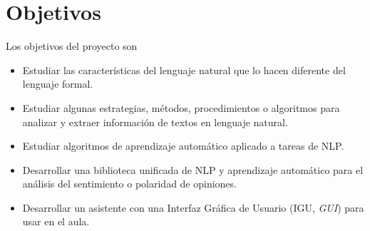 
\chapter{Objetivos}

Los objetivos del proyecto son

\begin{itemize}
\item Estudiar las características del lenguaje natural que lo hacen diferente del lenguaje formal.
\item Estudiar algunas estrategias, métodos, procedimientos o algoritmos para analizar y extraer información de textos en lenguaje natural.
\item Estudiar algoritmos de aprendizaje automático aplicado a tareas de NLP.
\item Desarrollar una biblioteca unificada de NLP y aprendizaje automático para el análisis del sentimiento o polaridad de opiniones.
\item Desarrollar un asistente con una Interfaz Gráfica de Usuario (IGU, \emph{GUI}) para usar en el aula.
\end{itemize}
